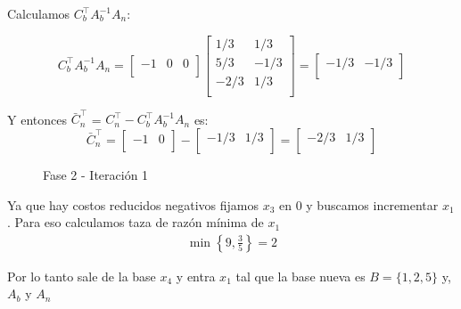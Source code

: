 \documentclass{article}
\begin{document}
\begin{flushleft}
		Calculamos $C_b^\intercal$$A_b^{-1}$$A_n$:
		
		\begin{equation*}
			C_b^\intercal A_b^{-1}A_n = \begin{bmatrix}
				-1 & 0 & 0 \\
			\end{bmatrix}
			\begin{bmatrix}
				1/3 & 1/3  \\
				5/3 & -1/3 \\
				-2/3 & 1/3 \\
			\end{bmatrix} = \begin{bmatrix}
				-1/3 & -1/3\\
			\end{bmatrix}
		\end{equation*}

		Y entonces \(\bar{C}_n^\intercal\) = \(C_n^\intercal - C_b^\intercal A_b^{-1} A_n\) es:
		\begin{equation*}
			\bar{C}_n^\intercal = \begin{bmatrix}
				-1 & 0 \\
			\end{bmatrix} - \begin{bmatrix}
				-1/3 & 1/3\\
			\end{bmatrix} = \begin{bmatrix}
				-2/3 & 1/3\\
			\end{bmatrix}
		\end{equation*}

		\begin{figure}[ht]
			\centering
			\caption{Fase 2 - Iteración 1}
			\label{fig:grafico}
		\end{figure}

		Ya que hay costos reducidos negativos fijamos $x_3$ en 0 y buscamos incrementar $x_1$. Para eso calculamos taza de razón mínima de $x_1$\\


		
		\begin{equation*}
			\begin{array}{cc}
				\min \left\{ 9, \frac{3}{5} \right\} = 2 
			\end{array}
		\end{equation*}

		Por lo tanto sale de la base $x_4$ y entra $x_1$ tal que la base nueva es $B = \{1,2,5\}$ y, $A_b$ y $A_n$\\


\end{flushleft}
\end{document}

